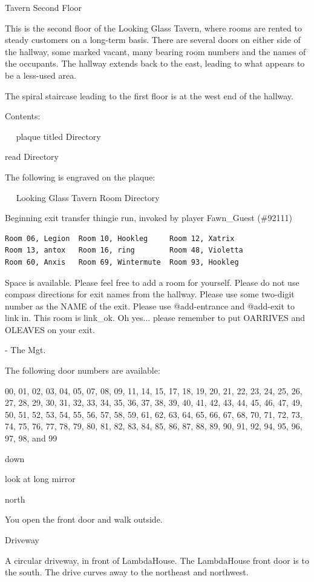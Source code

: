 \documentclass[10pt,twoside,openleft]{memoir}
\begin{document}
{Tavern Second Floor

This is the second floor of the Looking Glass Tavern, where rooms are
rented to steady customers on a long-term basis.  There are several doors on
either side of the hallway, some marked vacant, many bearing room numbers and
the names of the occupants.  The hallway extends back to the east, leading
to what appears to be a less-used area.

The spiral staircase leading to the first floor is at the west end of the
 hallway.

Contents:

~ ~plaque titled Directory

read Directory

The following is engraved on the plaque:

~ ~Looking Glass Tavern Room Directory

Beginning exit transfer thingie run, invoked by player Fawn\_Guest (\#92111)

\begin{verbatim}
Room 06, Legion  Room 10, Hookleg     Room 12, Xatrix
Room 13, antox   Room 16, ring        Room 48, Violetta
Room 60, Anxis   Room 69, Wintermute  Room 93, Hookleg
\end{verbatim}

Space is available.  Please feel free to add a room for yourself.
Please do not use compass directions for exit names from the hallway.
Please use some two-digit number as the NAME of the exit.
Please use @add-entrance and @add-exit to link in.  This room is link\_ok.
Oh yes... please remember to put OARRIVES and OLEAVES on your exit.

- The Mgt.

The following door numbers are available:

00, 01, 02, 03, 04, 05, 07, 08, 09, 11, 14, 15, 17, 18, 19, 20, 21, 22, 23, 24, 25, 26, 27, 28, 29, 30, 31, 32, 33, 34, 35, 36, 37, 38, 39, 40, 41, 42, 43, 44, 45, 46, 47, 49, 50, 51, 52, 53, 54, 55, 56, 57, 58, 59, 61, 62, 63, 64, 65, 66, 67, 68, 70, 71, 72, 73, 74, 75, 76, 77, 78, 79, 80, 81, 82, 83, 84, 85, 86, 87, 88, 89, 90, 91, 92, 94, 95, 96, 97, 98, and 99

down

look at long mirror

north

You open the front door and walk outside.

Driveway

A circular driveway, in front of LambdaHouse. The LambdaHouse front door is to
 the south. The drive curves away to the northeast and northwest.

}
\end{document}
